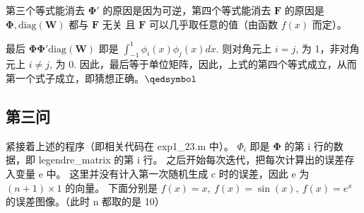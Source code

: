 \documentclass[11pt]{ctexart}
\begin{document}
    \vspace{1em}
    第三个等式能消去 \(\mathbf{\Phi'}\) 的原因是因为可逆，第四个等式能消去 \(\mathbf{F}\) 的原因是 \(\mathbf{\Phi},\text{diag}(\mathbf{W})\) 都与 \(\mathbf{F}\) 无关
    且 \(\mathbf{F}\) 可以几乎取任意的值（由函数 \(f(x)\) 而定）。

    最后 \(\mathbf{\Phi}\mathbf{\Phi'}\text{diag}(\mathbf{W})\) 即是 \(\int_{-1}^{1} \phi_{i}(x) \phi_{j}(x) d x\).
    则对角元上 \(i=j\), 为 1，非对角元上 \(i\neq j\), 为 0.
    因此，最后等于单位矩阵，因此，上式的第四个等式成立，从而第一个式子成立，即猜想正确。\hfill\(\qedsymbol\)

    \subsection{第三问}
    紧接着上述的程序（即相关代码在 exp1\_23.m 中）。
    \(\Phi_{i}\) 即是 \(\mathbf{\Phi}\) 的第 i 行的数据，即 legendre\_matrix 的第 i 行。
    之后开始每次迭代，把每次计算出的误差存入变量 e 中。
    这里并没有计入第一次随机生成 c 时的误差，因此 e 为 \((n+1)\times 1\) 的向量。
    下面分别是 \(f(x)=x,\ f(x)=\sin(x),\ f(x)=e^x\) 的误差图像。（此时 n 都取的是 10）
\end{document}
